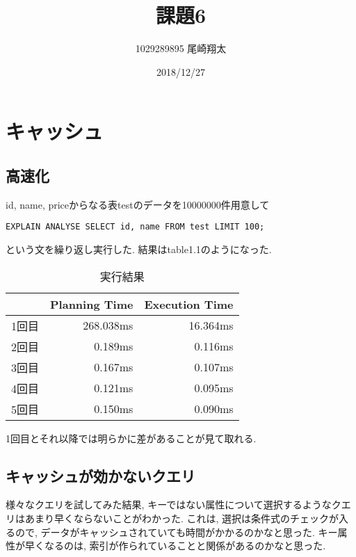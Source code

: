 \documentclass{jarticle}
\begin{document}
\title{課題6}
\author{1029289895 尾崎翔太}
\date{2018/12/27}

\maketitle
\newpage

\section{キャッシュ}
\subsection{高速化}
id, name, priceからなる表testのデータを10000000件用意して
\begin{verbatim}
EXPLAIN ANALYSE SELECT id, name FROM test LIMIT 100;
\end{verbatim}
という文を繰り返し実行した.
結果はtable1.1のようになった.
\begin{table}[htbp]
  \begin{tabular}{|l||r|r|} \hline
    & Planning Time & Execution Time \\ \hline \hline
    1回目 & 268.038ms & 16.364ms \\ \hline
    2回目 & 0.189ms & 0.116ms \\ \hline
    3回目 & 0.167ms & 0.107ms \\ \hline
    4回目 & 0.121ms & 0.095ms \\ \hline
    5回目 & 0.150ms & 0.090ms \\ \hline
  \end{tabular}
  \caption{実行結果}
  \centering
\end{table}
1回目とそれ以降では明らかに差があることが見て取れる.
\subsection{キャッシュが効かないクエリ}
様々なクエリを試してみた結果, キーではない属性について選択するようなクエリはあまり早くならないことがわかった. これは, 選択は条件式のチェックが入るので, データがキャッシュされていても時間がかかるのかなと思った. キー属性が早くなるのは, 索引が作られていることと関係があるのかなと思った.
\end{document}
